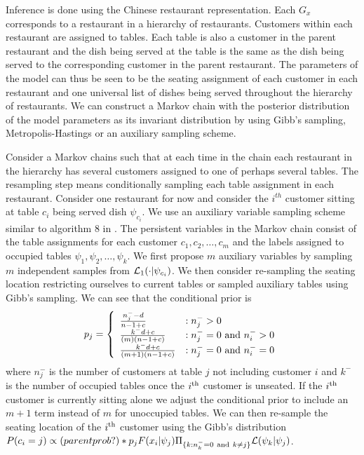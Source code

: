 Inference is done using the Chinese restaurant representation.  Each $G_x$ corresponds to a restaurant in a hierarchy of restaurants.  Customers within each restaurant are assigned to tables.  Each table is also a customer in the parent restaurant and the dish being served at the table is the same as the dish being served to the corresponding customer in the parent restaurant.  The parameters of the model can thus be seen to be the seating assignment of each customer in each restaurant and one universal list of dishes being served throughout the hierarchy of restaurants.  We can construct a Markov chain with the posterior distribution of the model parameters as its invariant distribution by using Gibb's sampling, Metropolis-Hastings or an auxiliary sampling scheme.  

Consider a Markov chains such that at each time in the chain each restaurant in the hierarchy has several customers assigned to one of perhaps several tables.  The resampling step means conditionally sampling each table assignment in each restaurant.  Consider one restaurant for now and consider the $i^{th}$ customer sitting at table $c_i$ being served dish $\psi_{c_i}$. We use an auxiliary variable sampling scheme similar to algorithm 8 in \cite{Neal sampling paper}.  The persistent variables in the Markov chain consist of the table assignments for each customer $c_1, c_2, \ldots, c_m$ and the labels assigned to occupied tables $\psi_1, \psi_2, \ldots, \psi_k$.  We first propose $m$ auxiliary variables by sampling $m$ independent samples from $\likelihood_1(\cdot | \psi_{c_i})$.  We then consider re-sampling the seating location restricting ourselves to current tables or sampled auxiliary tables using Gibb's sampling. We can see that the conditional prior is
%
\[
p_j = \left\{
\begin{array}{ll}
	\frac{n^-_j - d}{n-1+c} 			& : n^-_j > 0\\
	\frac{k^-d + c}{(m)(n-1+c)}		& : n^-_j =0 \ {\rm and } \ n^-_i > 0\\
	\frac{k^-d + c}{(m+1)(n-1+c)}	& : n^-_j =0 \ {\rm and } \ n^-_i = 0
\end{array}
\right. 
\]
%
where $n^-_j$ is the number of customers at table $j$ not including customer $i$ and  $k^-$ is the number of occupied tables once the $i^{\rm th}$ customer is unseated.  If the $i^{\rm th}$ customer is currently sitting alone we adjust the conditional prior to include an $m+1$ term instead of $m$ for unoccupied tables.  We can then re-sample the seating location of the $i^{\rm th}$ customer using the Gibb's distribution $P(c_i = j) \propto  (parent prob?) * p_j F(x_i | \psi_j)\Pi_{\{k : n^-_k = 0 \ {\rm and} \ k \neq j\}} \likelihood(\psi_k | \psi_j)$.
\[
\]



